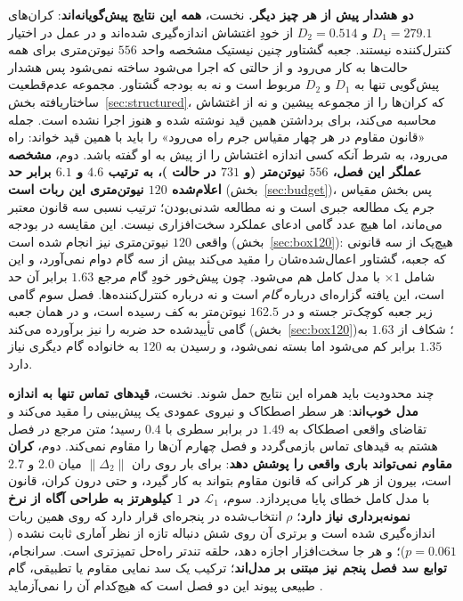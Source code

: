\documentclass[10pt,twocolumn]{article}
\newcommand{\en}[1]{\lr{#1}}
\newcommand{\md}{\lr{\textemdash}}
\begin{document}
\textbf{دو هشدار پیش از هر چیز دیگر.} نخست، \textbf{همه این نتایج پیش‌گویانه‌اند}:
کران‌های $D_1=279.1$ و $D_2=0.514$ از خودِ اغتشاش اندازه‌گیری شده‌اند و در عمل در
اختیار کنترل‌کننده نیستند. جعبه گشتاور چنین نیست\md{}یک مشخصه واحد $556$
نیوتن‌متری برای همه حالت‌ها به کار می‌رود و از حالتی که اجرا می‌شود ساخته نمی‌شود\md{}
پس هشدار پیش‌گویی تنها به $D_1$ و $D_2$ مربوط است و نه به بودجه گشتاور. مجموعه
عدم‌قطعیت ساختاریافته بخش~\ref{sec:structured}، که کران‌ها را از مجموعه پیشین و نه از
اغتشاش محاسبه می‌کند، برای برداشتن همین قید نوشته شده و هنوز اجرا نشده است.
جمله «قانون مقاوم در هر چهار مقیاس جرم راه می‌رود» را باید با همین قید خواند: راه
می‌رود، به شرط آنکه کسی اندازه اغتشاش را از پیش به او گفته باشد. دوم،
\textbf{مشخصه عملگر این فصل، $556$ نیوتن‌متر (و $731$ در حالت \en{IV})، به ترتیب
$4.6$ و $6.1$ برابر حد اعلام‌شده $120$ نیوتن‌متری این ربات است}
(بخش~\ref{sec:budget})، پس بخش مقیاس جرم یک مطالعه جبری است و نه مطالعه
شدنی‌بودن؛ ترتیب نسبی سه قانون معتبر می‌ماند، اما هیچ عدد گامی ادعای عملکرد
سخت‌افزاری نیست. این مقایسه در بودجه واقعی $120$ نیوتن‌متری نیز انجام شده است
(بخش~\ref{sec:box120}): هیچ‌یک از سه قانونی که جعبه، گشتاور اعمال‌شده‌شان را مقید
می‌کند بیش از سه گام دوام نمی‌آورد، و این شامل $\times1$ با مدل کامل هم می‌شود. چون
پیش‌خور خودِ گام مرجع $1.63$ برابر آن حد است، این یافته گزاره‌ای درباره \emph{گام}
است و نه درباره کنترل‌کننده‌ها. فصل سوم گامی زیر جعبه کوچک‌تر جسته و در
$162.5$ نیوتن‌متر به کف رسیده است، و در همان جعبه گامی تأییدشده حد ضربه را نیز برآورده
می‌کند (بخش~\ref{sec:box120})؛ شکاف از $1.63$ به $1.35$
برابر کم می‌شود اما بسته نمی‌شود، و رسیدن به $120$ به خانواده گام دیگری نیاز دارد.


چند محدودیت باید همراه این نتایج حمل شوند. نخست، \textbf{قیدهای تماس تنها به اندازه
مدل خوب‌اند}: هر سطر اصطکاک و نیروی عمودی یک پیش‌بینی را مقید می‌کند و تقاضای واقعی
اصطکاک به $1.49$ در برابر سطری با $0.4$ رسید؛ متن مرجع در فصل هشتم به قیدهای تماس
بازمی‌گردد و فصل چهارم آن‌ها را مقاوم نمی‌کند. دوم، \textbf{کران مقاوم نمی‌تواند باری
واقعی را پوشش دهد}: برای بار روی ران $\|\Delta_2\|$ میان $2.0$ و $2.7$ است، بیرون از هر
کرانی که قانون مقاوم بتواند به کار گیرد، و حتی درون کران، قانون با مدل کامل خطای پایا
می‌پردازد. سوم، \textbf{$\mathcal{L}_1$ در $1$ کیلوهرتز به طراحی آگاه از نرخ
نمونه‌برداری نیاز دارد}؛ $\rho$ انتخاب‌شده در پنجره‌ای قرار دارد که روی همین ربات
اندازه‌گیری شده است و برتری آن روی شش دنباله تازه از نظر آماری ثابت نشده ($p=0.061$)؛ و هر جا سخت‌افزار
اجازه دهد، حلقه تندتر راه‌حل تمیزتری است. سرانجام، \textbf{توابع سد فصل پنجم نیز
مبتنی بر مدل‌اند}؛ ترکیب یک سد نمایی مقاوم یا تطبیقی، گام طبیعی پیوند این دو فصل است
که هیچ‌کدام آن را نمی‌آزماید \cite{nguyen2016ecbf,xu2015robustness}.
\end{document}
